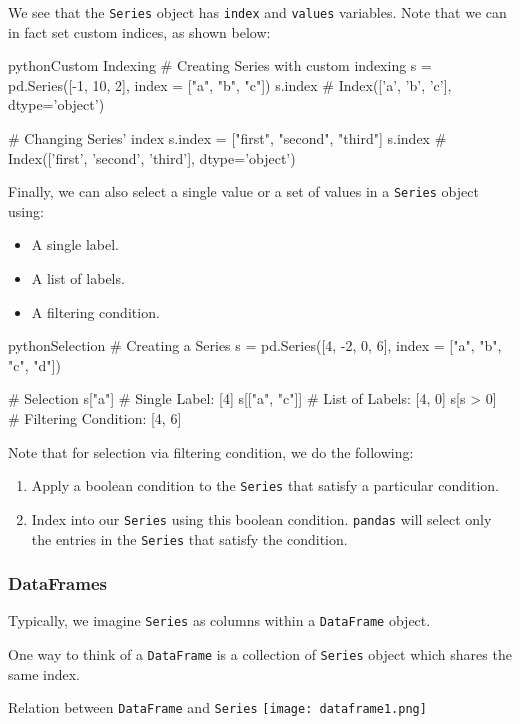 \documentclass[openany]{book}
\begin{document}
We see that the \texttt{Series} object has \texttt{index} and \texttt{values} variables. Note that we can in fact set custom indices, as shown below:

\begin{code}{python}{Custom Indexing}
# Creating Series with custom indexing
s = pd.Series([-1, 10, 2], index = ["a", "b", "c"])
s.index # Index(['a', 'b', 'c'], dtype='object')

# Changing Series' index
s.index = ["first", "second", "third"]
s.index # Index(['first', 'second', 'third'], dtype='object')
\end{code}

Finally, we can also select a single value or a set of values in a \texttt{Series} object using:
\begin{itemize}
	\item A single label.
	\item A list of labels.
	\item A filtering condition.
\end{itemize}

\begin{code}{python}{Selection}
# Creating a Series
s = pd.Series([4, -2, 0, 6], index = ["a", "b", "c", "d"])

# Selection
s["a"] # Single Label: [4]
s[["a", "c"]] # List of Labels: [4, 0]
s[s > 0] # Filtering Condition: [4, 6]
\end{code}

Note that for selection via filtering condition, we do the following:
\begin{enumerate}
	\item Apply a boolean condition to the \texttt{Series} that satisfy a particular condition.
	\item Index into our \texttt{Series} using this boolean condition. \texttt{pandas} will select only the entries in the \texttt{Series} that satisfy the condition.
\end{enumerate}

\subsubsection{DataFrames}
Typically, we imagine \texttt{Series} as columns within a \texttt{DataFrame} object.

One way to think of a \texttt{DataFrame} is a collection of \texttt{Series} object which shares the same index.

\begin{figurebox}{Relation between \texttt{DataFrame} and \texttt{Series}}
	\centering\texttt{[image: dataframe1.png]}
\end{figurebox}
\end{document}
